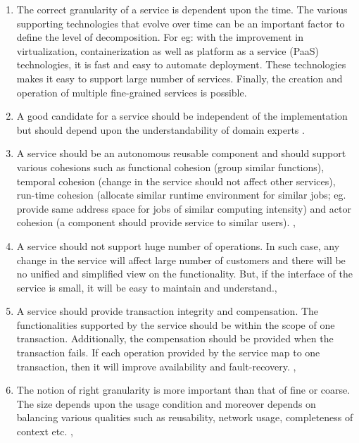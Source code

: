 \begin{enumerate}
\item The correct granularity of a service is dependent upon the time. The various supporting technologies that evolve over time can be an important factor to define the level of decomposition. For eg: with the improvement in virtualization, containerization as well as platform as a service (\acrshort{PaaS}) technologies, it is fast and easy to automate deployment. These technologies makes it easy to support large number of services. Finally, the creation and operation of multiple fine-grained services is possible.\cite{Peter-Herzum:2000aa}

\item A good candidate for a service should be independent of the implementation but should depend upon the understandability of domain experts \cite{Raf-Haesen:2015aa, Peter-Herzum:2000aa}.

\item A service should be an autonomous reusable component and should support various cohesions such as functional cohesion (group similar functions), temporal cohesion (change in the service should not affect other services), run-time cohesion (allocate similar runtime environment for similar jobs; eg. provide same address space for jobs of similar computing intensity) and actor cohesion (a component should provide service to similar users).
\cite{Raf-Haesen:2015aa}, \cite{Peter-Herzum:2000aa}

\item A service should not support huge number of operations. In such case, any change in the service will affect large number of customers and there will be no unified and simplified view on the functionality. But, if the interface of the service is small, it will be easy to maintain and understand.\cite{Raf-Haesen:2015aa}, \cite{Pierre-Reldin:2007aa}

\item A service should provide transaction integrity and compensation. The functionalities supported by the service should be within the scope of one transaction. Additionally, the compensation should be provided when the transaction fails. If each operation provided by the service map to one transaction, then it will improve availability and fault-recovery. \cite{Raf-Haesen:2015aa}, \cite{Foody:2005aa} \cite{Bianco:2007aa}

\item The notion of right granularity is more important than that of fine or coarse. The size depends upon the usage condition and moreover depends on balancing various qualities such as reusability, network usage, completeness of context etc. \cite{Raf-Haesen:2015aa}, \cite{Lawrence-Wilkes:2004aa}


\end{enumerate}
